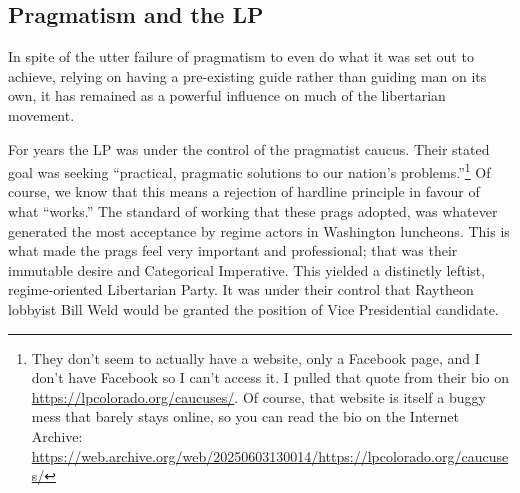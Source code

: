 \documentclass[11pt]{article}
\begin{document}
\subsection{Pragmatism and the LP}
\label{sec:org84498ba}
In spite of the utter failure of pragmatism to even do what it was set out to achieve, relying on having a pre-existing guide rather than guiding man on its own, it has remained as a powerful influence on much of the libertarian movement.

For years the LP was under the control of the pragmatist caucus. Their stated goal was seeking ``practical, pragmatic solutions to our nation's problems.''\footnote{They don't seem to actually have a website, only a Facebook page, and I don't have Facebook so I can't access it. I pulled that quote from their bio on \url{https://lpcolorado.org/caucuses/}. Of course, that website is itself a buggy mess that barely stays online, so you can read the bio on the Internet Archive: \url{https://web.archive.org/web/20250603130014/https://lpcolorado.org/caucuses/}} Of course, we know that this means a rejection of hardline principle in favour of what ``works.'' The standard of working that these prags adopted, was whatever generated the most acceptance by regime actors in Washington luncheons. This is what made the prags feel very important and professional; that was their immutable desire and Categorical Imperative. This yielded a distinctly leftist, regime-oriented Libertarian Party. It was under their control that Raytheon lobbyist Bill Weld would be granted the position of Vice Presidential candidate.
\end{document}
